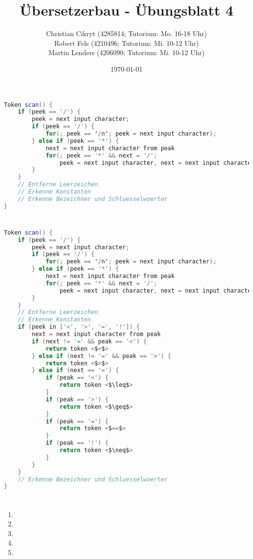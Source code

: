 \documentclass[a4paper,10pt]{scrartcl}
\title{Übersetzerbau - Übungsblatt 4}
\author{Christian Cikryt (4285814; Tutorium: Mo. 16-18 Uhr)\\
  Robert Fels (4210496; Tutorium: Mi. 10-12 Uhr)\\
  Martin Lenders (4206090; Tutorium: Mi. 10-12 Uhr)
  }
\date{\today}
\begin{document}
\maketitle

\section{}
\begin{lstlisting}[language=Java]
Token scan() {
    if (peek == '/') {
        peek = next input character;
        if (peek == '/') {
            for(; peek == '/n'; peek = next input character);
        } else if (peek == '*') {
            next = next input character from peak
            for(; peek == '*' && next = '/'; 
                peek = next input character, next = next input character from peak);
        }
    }
    // Entferne Leerzeichen
    // Erkenne Konstanten
    // Erkenne Bezeichner und Schluesselwoerter
}
\end{lstlisting}


\section{}
\begin{lstlisting}[language=Java,mathescape=True]
Token scan() {
    if (peek == '/') {
        peek = next input character;
        if (peek == '/') {
            for(; peek == '/n'; peek = next input character);
        } else if (peek == '*') {
            next = next input character from peak
            for(; peek == '*' && next = '/'; 
                peek = next input character, next = next input character from peak);
        }
    }
    // Entferne Leerzeichen
    // Erkenne Konstanten
    if (peek in ['<', '>', '=', '!']) {
        next = next input character from peak
        if (next != '=' && peak == '<') {
            return token <$<$>
        } else if (next != '=' && peak == '>') {
            return token <$>$>
        } else if (next == '=') {
            if (peak == '<') {
                return token <$\leq$>
            }
            if (peak == '>') {
                return token <$\geq$>
            }
            if (peak == '=') {
                return token <$==$>
            }
            if (peak == '!') {
                return token <$\neq$>
            }
        }
    }
    // Erkenne Bezeichner und Schluesselwoerter
}
\end{lstlisting}

\section{}

\section{}

\section{}
\begin{enumerate}
\item   
\item   
\item   
\item   
\item   
\end{enumerate}
\end{document}
